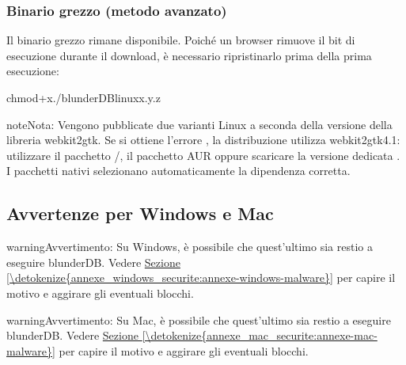 \documentclass[letterpaper,10pt,italian]{sphinxmanual}
\begin{document}
\subsubsection{Binario grezzo (metodo avanzato)}
\label{\detokenize{telecharge_install:binaire-brut-methode-avancee}}
\sphinxAtStartPar
Il binario grezzo  rimane disponibile. Poiché un browser rimuove il bit di esecuzione durante il download, è necessario ripristinarlo prima della prima esecuzione:

\begin{sphinxVerbatim}[commandchars=\\\{\}]
chmod+x./blunderDB\PYGZhy{}linux\PYGZhy{}x.y.z
\end{sphinxVerbatim}

\begin{sphinxadmonition}{note}{Nota:}
\sphinxAtStartPar
Vengono pubblicate due varianti Linux a seconda della versione della libreria webkit2gtk. Se si ottiene l’errore , la distribuzione utilizza webkit2gtk\sphinxhyphen{}4.1: utilizzare il pacchetto /, il pacchetto AUR oppure scaricare la versione dedicata . I pacchetti nativi selezionano automaticamente la dipendenza corretta.
\end{sphinxadmonition}


\subsection{Avvertenze per Windows e Mac}
\label{\detokenize{telecharge_install:avertissements-windows-et-mac}}
\begin{sphinxadmonition}{warning}{Avvertimento:}
\sphinxAtStartPar
Su Windows, è possibile che quest’ultimo sia restio a eseguire blunderDB. Vedere \hyperref[\detokenize{annexe_windows_securite:annexe-windows-malware}]{Sezione \ref{\detokenize{annexe_windows_securite:annexe-windows-malware}}} per capire il motivo e aggirare gli eventuali blocchi.
\end{sphinxadmonition}

\begin{sphinxadmonition}{warning}{Avvertimento:}
\sphinxAtStartPar
Su Mac, è possibile che quest’ultimo sia restio a eseguire blunderDB. Vedere \hyperref[\detokenize{annexe_mac_securite:annexe-mac-malware}]{Sezione \ref{\detokenize{annexe_mac_securite:annexe-mac-malware}}} per capire il motivo e aggirare gli eventuali blocchi.
\end{sphinxadmonition}
\end{document}
